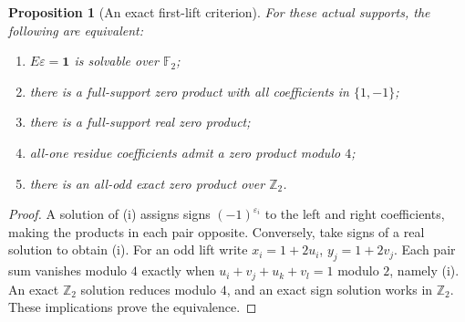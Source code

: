 \documentclass[11pt,a4paper,oneside]{report}
\newtheorem{proposition}[theorem]{Proposition}
\theoremstyle{definition}
\theoremstyle{remark}
\newcommand{\Z}{\mathbb Z}
\newcommand{\F}{\mathbb F}
\newcommand{\one}{\mathbf 1}
\begin{document}
\begin{proposition}[An exact first-lift criterion]\label{M04:prop:signs}
For these actual supports, the following are equivalent:
\begin{enumerate}[label=(\roman*)]
\item $E\varepsilon=\one$ is solvable over $\F_2$;
\item there is a full-support zero product with all coefficients in $\{1,-1\}$;
\item there is a full-support real zero product;
\item all-one residue coefficients admit a zero product modulo $4$;
\item there is an all-odd exact zero product over $\Z_2$.
\end{enumerate}
\end{proposition}
\begin{proof}
A solution of (i) assigns signs $(-1)^{\varepsilon_i}$ to the left
and right coefficients, making the products in each pair opposite.
Conversely, take signs of a real solution to obtain (i).
For an odd lift write $x_i=1+2u_i$, $y_j=1+2v_j$. Each pair sum
vanishes modulo $4$ exactly when
$u_i+v_j+u_k+v_l=1$ modulo $2$, namely (i).
An exact $\Z_2$ solution reduces modulo $4$, and an exact sign solution
works in $\Z_2$. These implications prove the equivalence.
\end{proof}
\end{document}
